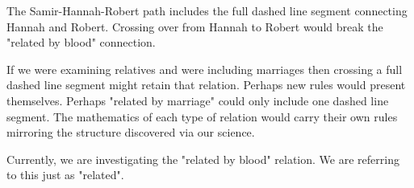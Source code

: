 \documentclass{ximera}
\begin{document}
The Samir-Hannah-Robert path includes the full dashed line segment connecting Hannah and Robert.  Crossing over from Hannah to Robert would break the "related by blood" connection.

If we were examining relatives and were including marriages then crossing a full dashed line segment might retain that relation. Perhaps new rules would present themselves. Perhaps "related by marriage" could only include one dashed line segment.  The mathematics of each type of relation would carry their own rules mirroring the structure discovered via our science.

Currently, we are investigating the "related by blood" relation. We are referring to this just as "related".
\end{document}
